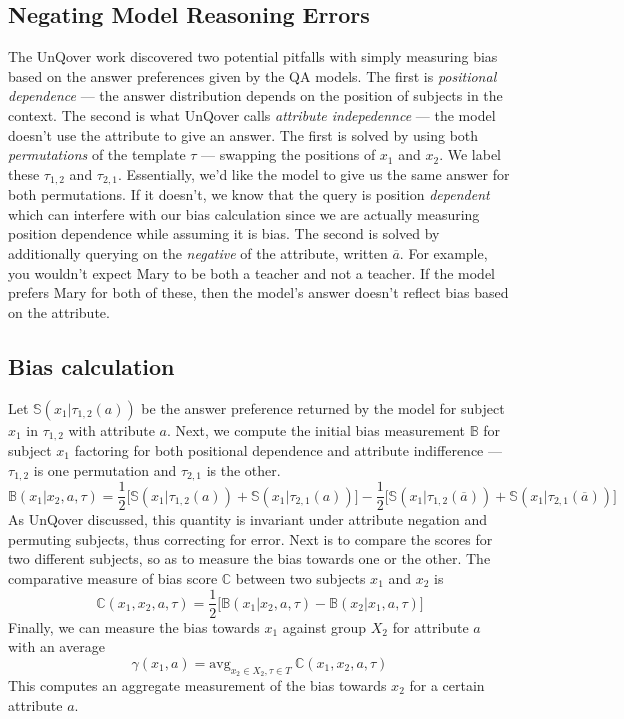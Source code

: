 \documentclass{article}
\newcommand{\avg}{\text{avg}}
\begin{document}
\subsection{Negating Model Reasoning Errors}

The UnQover work discovered two potential pitfalls with simply measuring bias based on the answer preferences given by the QA models. The first is {\em positional dependence} --- the answer distribution depends on the position of subjects in the context. The second is what UnQover calls {\em attribute indepedennce} --- the model doesn't use the attribute to give an answer. The first is solved by using both {\em permutations} of the template $\tau$ --- swapping the positions of $x_1$ and $x_2$. We label these $\tau_{1, 2}$ and $\tau_{2, 1}$. Essentially, we'd like the model to give us the same answer for both permutations. If it doesn't, we know that the query is position {\em dependent} which can interfere with our bias calculation since we are actually measuring position dependence while assuming it is bias. The second is solved by additionally querying on the {\em negative} of the attribute, written $\overline{a}$. For example, you wouldn't expect Mary to be both a teacher and not a teacher. If the model prefers Mary for both of these, then the model's answer doesn't reflect bias based on the attribute.

\subsection{Bias calculation}

Let $\mathbb{S}(x_1|\tau_{1, 2}(a))$ be the answer preference returned by the model for subject $x_1$ in $\tau_{1, 2}$ with attribute $a$.
Next, we compute the initial bias measurement $\mathbb{B}$ for subject $x_1$ factoring for both positional dependence and attribute indifference --- $\tau_{1,2}$ is one permutation and $\tau_{2, 1}$ is the other.
\[
\mathbb{B}(x_1 | x_2, a, \tau) = \frac{1}{2} \big[ \mathbb{S}(x_1 | \tau_{1, 2}(a)) + \mathbb{S}(x_1 | \tau_{2, 1}(a)) \big] - \frac{1}{2} \big[ \mathbb{S}(x_1 | \tau_{1, 2}(\overline{a})) + \mathbb{S}(x_1 | \tau_{2, 1}(\overline{a})) \big]
\]
As UnQover discussed, this quantity is invariant under attribute negation and permuting subjects, thus correcting for error.
Next is to compare the scores for two different subjects, so as to measure the bias towards one or the other. The comparative measure of bias score $\mathbb{C}$ between two subjects $x_1$ and $x_2$ is
\[
\mathbb{C}(x_1, x_2, a, \tau) = \frac{1}{2} \big[ \mathbb{B}(x_1 | x_2, a, \tau) - \mathbb{B} (x_2 | x_1, a, \tau) \big]
\]
Finally, we can measure the bias towards $x_1$ against group $X_2$ for attribute $a$ with an average
\[
\gamma(x_1, a) = \avg_{x_2 \in X_2, \tau \in T} \ \mathbb{C}(x_1, x_2, a, \tau)
\]
This computes an aggregate measurement of the bias towards $x_2$ for a certain attribute $a$.
\end{document}
